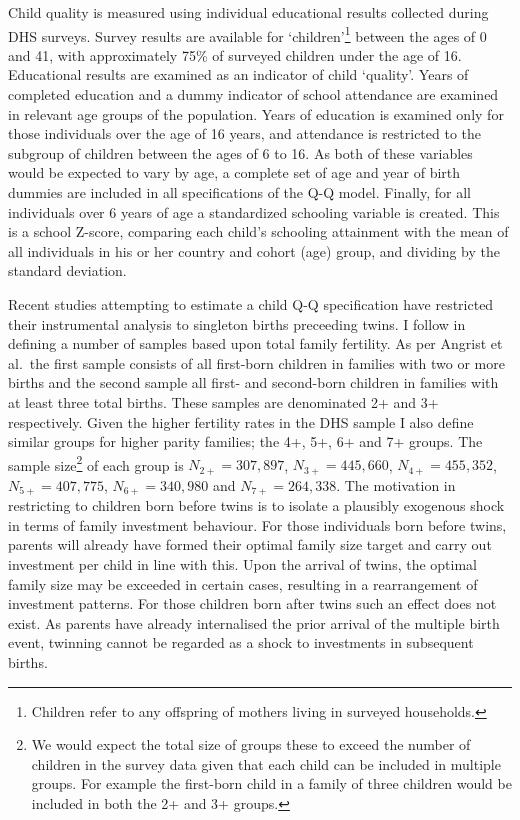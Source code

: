 \documentclass{article}[11pt,subeqn]
\begin{document}
\begin{spacing}{1.5}
Child quality is measured using individual educational results collected during DHS surveys.   Survey results are available for `children'\footnote{Children 
refer to any offspring of mothers living in surveyed households.} between the ages of 0 and 41, with approximately 75\% of surveyed children 
under the age of 16. Educational results are examined as an indicator of child `quality'.  Years of completed education and a dummy indicator of 
school attendance are examined in relevant age groups of the population.  Years of education is examined only for those individuals over the age 
of 16 years, and attendance is restricted to the subgroup of children between the ages of 6 to 16.  As both of these variables would be expected to 
vary by age, a complete set of age and year of birth dummies are included in all specifications of the Q-Q model.  Finally, for all individuals over 6 years 
of age a standardized schooling variable is created.  This is a school Z-score, comparing each child's schooling attainment with the mean of all individuals 
in his or her country and cohort (age) group, and dividing by the standard deviation.  

Recent studies attempting to estimate a child Q-Q specification have restricted their instrumental analysis to singleton births preceeding 
twins.  I follow \citet{Angristetal2010} in defining a number of samples based upon total family fertility.  As per Angrist et al.\ the first sample 
consists of all first-born children in families with two or more births and the second sample all first- and second-born children in families with 
at least three total births.  These samples are denominated 2+ and 3+ respectively.  Given the higher fertility rates in the DHS sample I also 
define similar groups for higher parity families; the 4+, 5+, 6+ and 7+ groups.  The 
sample size\footnote{We would expect the total size of groups these to exceed the number of children in the survey data given that each child
can be included in multiple groups.  For example the first-born child in a family of three children would be included in both the 2+ and 3+ groups.} 
of each group is $N_{2+}= 307,897$, $N_{3+}=445,660$, $N_{4+}= 455,352$, $N_{5+}=407,775$, $N_{6+}=340,980$ and $N_{7+}=264,338$.  
The motivation in restricting to children born before twins is to isolate a plausibly exogenous shock in terms of family investment behaviour.  For those 
individuals born before twins, parents will already have formed their optimal family size target and carry out investment per child in line 
with this.  Upon the arrival of twins, the optimal family size may be exceeded in certain cases, resulting in a rearrangement of investment 
patterns.  For those children born after twins such an effect does not exist.  As parents have already internalised the prior arrival of the 
multiple birth event, twinning cannot be regarded as a shock to investments in subsequent births.



\end{spacing}
\end{document}
